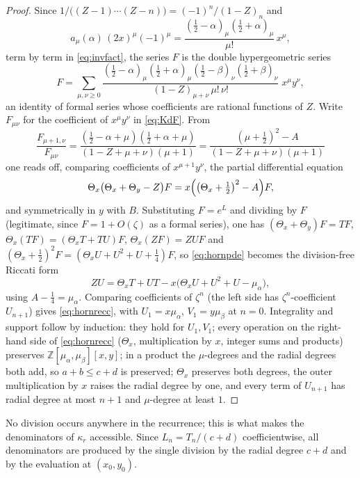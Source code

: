 \documentclass[10pt,a4paper]{amsart}
\newcommand{\ma}{\mu_\alpha}
\newcommand{\mb}{\mu_\beta}
\begin{document}
\begin{proof}
Since $1/\bigl((Z-1)\cdots(Z-n)\bigr)=(-1)^n/(1-Z)_n$ and
\[
  a_\mu(\alpha)\,(2x)^\mu(-1)^\mu
  =\frac{(\tfrac12-\alpha)_\mu(\tfrac12+\alpha)_\mu}{\mu!}\,x^\mu ,
\]
term by term in \eqref{eq:invfact}, the series $F$ is the double hypergeometric series
\begin{equation}\label{eq:KdF}
  F=\sum_{\mu,\nu\ge0}
  \frac{(\tfrac12-\alpha)_\mu(\tfrac12+\alpha)_\mu
        (\tfrac12-\beta)_\nu(\tfrac12+\beta)_\nu}
       {(1-Z)_{\mu+\nu}\,\mu!\,\nu!}\;x^\mu y^\nu ,
\end{equation}
an identity of formal series whose coefficients are rational functions of $Z$.  Write $F_{\mu\nu}$ for the coefficient of $x^\mu y^\nu$ in
\eqref{eq:KdF}.  From
\[
  \frac{F_{\mu+1,\nu}}{F_{\mu\nu}}
  =\frac{(\tfrac12-\alpha+\mu)(\tfrac12+\alpha+\mu)}
        {(1-Z+\mu+\nu)(\mu+1)}
  =\frac{(\mu+\tfrac12)^2-A}{(1-Z+\mu+\nu)(\mu+1)}
\]
one reads off, comparing coefficients of $x^{\mu+1}y^\nu$, the partial differential equation
\begin{equation}\label{eq:hornpde}
  \Theta_x\bigl(\Theta_x+\Theta_y-Z\bigr)F
  =x\Bigl(\bigl(\Theta_x+\tfrac12\bigr)^2-A\Bigr)F ,
\end{equation}
and symmetrically in $y$ with $B$.  Substituting $F=e^L$ and dividing by $F$ (legitimate, since $F=1+O(\zeta)$ as a formal series), one has $(\Theta_x+\Theta_y)F=TF$, $\Theta_x(TF)=(\Theta_xT+TU)F$, $\Theta_x(ZF)=ZUF$ and $(\Theta_x+\tfrac12)^2F=(\Theta_xU+U^2+U+\tfrac14)F$, so \eqref{eq:hornpde} becomes the division-free Riccati form \begin{equation}\label{eq:riccati}
  ZU=\Theta_xT+UT-x\bigl(\Theta_xU+U^2+U-\ma\bigr),
\end{equation}
using $A-\tfrac14=\ma$.  Comparing coefficients of $\zeta^n$ (the left side has $\zeta^n$-coefficient $U_{n+1}$) gives \eqref{eq:hornrecc}, with $U_1=x\ma$, $V_1=y\mb$ at $n=0$.  Integrality and support follow by induction: they hold for $U_1,V_1$; every operation on the right-hand side of \eqref{eq:hornrecc}  ($\Theta_x$, multiplication by $x$, integer sums and products) preserves $\mathbb Z[\ma,\mb][x,y]$; in a product the $\mu$-degrees and the radial degrees both add, so $a+b\le c+d$ is preserved; $\Theta_x$ preserves both degrees, the outer multiplication by $x$ raises the radial degree by one, and every term of $U_{n+1}$ has radial degree at most $n+1$ and $\mu$-degree at least $1$.
\end{proof}

No division occurs anywhere in the recurrence; this is what makes the denominators of $\kappa_r$ accessible.  Since $L_n=T_n/(c+d)$ coefficientwise, all denominators are produced by the single division by the radial degree $c+d$ and by the evaluation at $(x_0,y_0)$.
\end{document}
